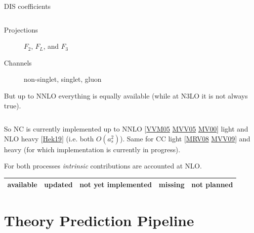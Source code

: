 \documentclass[9pt]{beamer}
\providecommand{\iRef}[1]{{\color{mLightGreen}\small $[$#1$]$}}
\begin{document}
\begin{frame}{DIS coefficients}
\begin{columns}
\begin{column}{0.5\textwidth}
            \begin{description}
                \item[Projections] $F_2$, $F_L$, and $F_3$
                \item[Channels] non-singlet, singlet, gluon
            \end{description}

            \vspace*{10pt}
            {
                \footnotesize
                But up to NNLO everything is equally available (while at N3LO
                it is not always true).
            }
        \end{column}
    \end{columns}

    \vspace*{10pt}

    So NC is currently implemented up to NNLO
    \iRef{\href{https://doi.org/10.1016/j.nuclphysb.2005.06.020}{VVM05}
    \href{https://doi.org/10.1016/j.physletb.2004.11.063}{MVV05}
    \href{https://doi.org/10.1016/S0550-3213(00)00045-6}{MV00}}
    light and NLO heavy \iRef{\href{https://arxiv.org/abs/1910.01536}{Hek19}}
    (i.e. both $O(a_s^2)$).
    Same for CC light
    \iRef{\href{https://doi.org/10.1016/j.nuclphysb.2007.09.022}{MRV08}
    \href{https://doi.org/10.1016/j.nuclphysb.2009.01.001}{MVV09}} and heavy
    (for which implementation is currently in progress).

    For both processes \textit{intrinsic} contributions are accounted at NLO.
    
    \vspace*{15pt}
    {
        \footnotesize
        \begin{flushright}
            \begin{tabular}{c c c c c} 
                \cellcolor{green!25}available & \cellcolor{blue!25}updated
                                            &\cellcolor{yellow!25}not yet implemented
                                            &\cellcolor{red!25}missing
                                            & not planned\\
                \hline
            \end{tabular}
        \end{flushright}
    }
\end{frame}

\section{Theory Prediction Pipeline}
\end{document}
